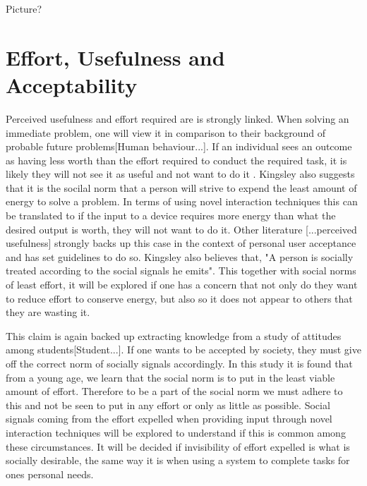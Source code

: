 \documentclass{l4proj}
\begin{document}
Picture?


\section{Effort, Usefulness and Acceptability}

Perceived usefulness and effort required are is strongly linked. When solving an immediate problem, one will view it in comparison to their background of probable future problems[Human behaviour...].  If an individual sees an outcome as having less worth than the effort required to conduct the required task, it is likely they will not see it as useful and not want to do it . Kingsley also suggests that it is the socilal norm that a person will strive to expend the least amount of energy to solve a problem. In terms of using novel interaction techniques this can be translated to if the input to a device requires more energy than what the desired output is worth, they will not want to do it. Other literature [...perceived usefulness] strongly backs up this case in the context of personal user acceptance and has set guidelines to do so. Kingsley also believes that, "A person is socially treated according to the social signals he emits". This together with social norms of least effort, it will be explored if one has a concern that not only do they want to reduce effort to conserve energy, but also so it does not appear to others that they are wasting it. 

This claim is again backed up extracting knowledge from a study of attitudes among students[Student...]. If one wants to be accepted by society, they must give off the correct norm of socially signals accordingly. In this study it is found that from a young age, we learn that the social norm is to put in the least viable amount of effort. Therefore to be a part of the social norm we must adhere to this and not be seen to put in any effort or only as little as possible. Social signals coming from the effort expelled when providing input through novel interaction techniques will be explored to understand if this is common among these circumstances. It will be decided if invisibility of effort expelled is what is socially desirable, the same way it is when using a system to complete tasks for ones personal needs.
\end{document}
